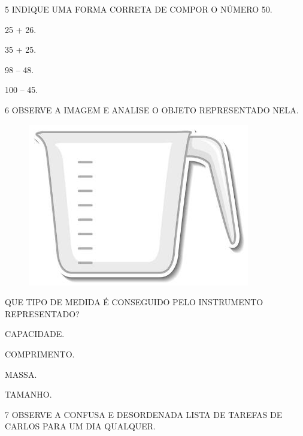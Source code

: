 \num{5} INDIQUE UMA FORMA CORRETA DE COMPOR O NÚMERO 50.

\begin{escolha}%
\item 25 + 26.

\item 35 + 25.

\item 98 -- 48.

\item 100 -- 45.
\end{escolha}

\num{6} OBSERVE A IMAGEM E ANALISE O OBJETO REPRESENTADO NELA.


\begin{figure}[H]
\centering
\includegraphics[width=.8\textwidth]{media/image107.jpg}
\end{figure}

QUE TIPO DE MEDIDA É CONSEGUIDO PELO INSTRUMENTO REPRESENTADO?

\begin{escolha}%
\item CAPACIDADE.

\item COMPRIMENTO.

\item MASSA.

\item TAMANHO.
\end{escolha}

\num{7} OBSERVE A CONFUSA E DESORDENADA LISTA DE TAREFAS DE CARLOS PARA UM DIA
QUALQUER.

